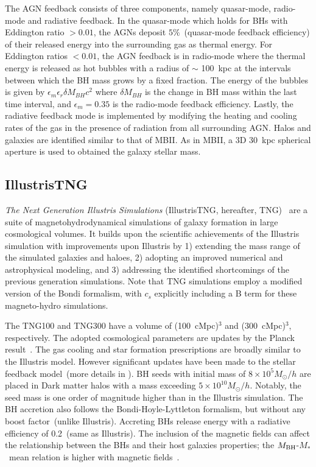 \documentclass[twocolumn]{aastex631}
\def\smass{{$M_*$}}
\def\mbh{$M_{\rm BH}$}
\begin{document}
The AGN feedback consists of three components, namely quasar-mode, radio-mode and radiative feedback. In the quasar-mode which holds for BHs with Eddington ratio $>0.01$, the AGNs deposit $5\%$~(quasar-mode feedback efficiency) of their released energy into the surrounding gas as thermal energy. For Eddington ratios $<0.01$, the AGN feedback is in radio-mode where the thermal energy is released as hot bubbles with a radius of $\sim$ 100~kpc at the intervals between which the BH mass grows by a fixed fraction. 
The energy of the bubbles is given by $\epsilon_m \epsilon_r \delta M_{BH} c^2$ where $\delta M_{BH}$ is the change in BH mass within the last time interval, and $\epsilon_m=0.35$ is the radio-mode feedback efficiency. Lastly, the radiative feedback mode is implemented by modifying the heating and cooling rates of the gas in the presence of radiation from all surrounding AGN. Halos and galaxies are identified similar to that of MBII. As in MBII, a 3D 30~kpc spherical aperture is used to obtained the galaxy stellar mass. %


\subsection{IllustrisTNG}
{\it The Next Generation Illustris Simulations} (IllustrisTNG, hereafter, TNG)~\citep{2018MNRAS.475..676S, Pillepich2018, Naiman2018, Marinacci2018, Nelson2018} are a suite of magnetohydrodynamical simulations of galaxy formation in large cosmological volumes. It builds upon the scientific achievements of the Illustris simulation with improvements upon Illustris by 1) extending the mass range of the simulated galaxies and haloes, 2) adopting an improved numerical and astrophysical modeling, and 3) addressing the identified shortcomings of the previous generation simulations. Note that TNG simulations employ a modified version of the Bondi formalism, with $c_s$ explicitly including a B term for these magneto-hydro simulations.

The TNG100 and TNG300 have a volume of (100~cMpc)$^3$ and (300~cMpc)$^3$, respectively. The adopted cosmological parameters are updates by the Planck result~\citep{2016A&A...594A..13P}.
The gas cooling and star formation prescriptions are broadly similar to the Illustris model. However significant updates have been made to the stellar feedback model~(more details in \citealt{2018MNRAS.473.4077P}).
BH seeds with initial mass of $8 \times 10^5 M_{\odot}/h$ are placed in Dark matter halos with a mass exceeding $5 \times 10^{10} M_{\odot}/h$. Notably, the seed mass is one order of magnitude higher than in the Illustris simulation. The BH accretion also follows the Bondi-Hoyle-Lyttleton formalism, but without any boost factor~(unlike Illustris). Accreting BHs release energy with a radiative efficiency of 0.2~(same as Illustris). The inclusion of the magnetic fields can affect the relationship between the BHs and their host galaxies properties; the \mbh-\smass\ mean relation is higher with magnetic fields~\citep{2018MNRAS.473.4077P}. 
\end{document}
